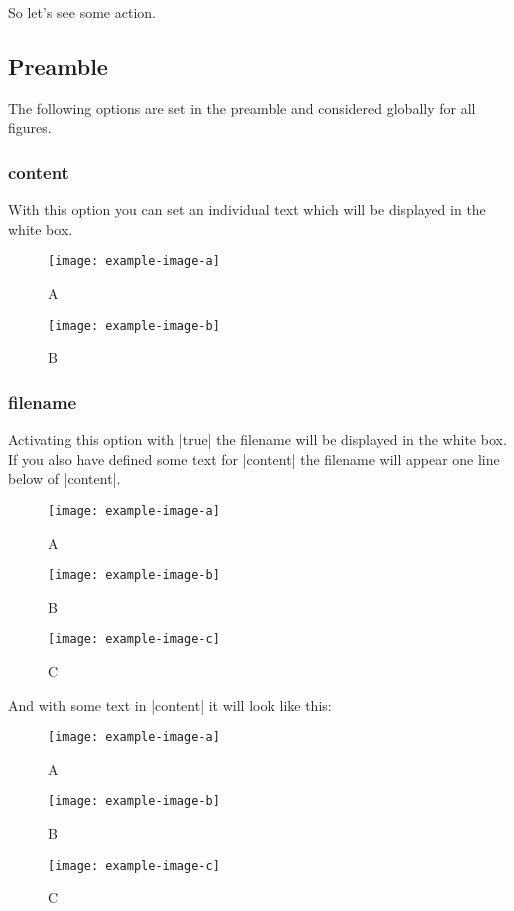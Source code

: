 \documentclass[a4paper,
10pt,
english
]{ltxdoc}
\begin{document}
So let’s see some action.
\subsection{Preamble}
The following options are set in the preamble and considered globally for all figures.
\subsubsection{content}
With this option you can set an individual text which will be displayed in the white box.
\begin{code}
\usepackage[%
  content = {This figure is omitted due to missing copyrights.},%
  ]{draftfigure}
\end{code}
\begin{examplebox}
\begin{figure}[H]
  \centering
  \texttt{[image: example-image-a]}
  \caption{A}
  \texttt{[image: example-image-b]}
  \caption{B}
\end{figure}
\end{examplebox}
\clearpage
\subsubsection{filename}
Activating this option with |true| the filename will be displayed in the white box.
If you also have defined some text for |content| the filename will appear one line below of |content|.
\begin{code}
\usepackage[%
  filename,%
  ]{draftfigure}
\end{code}
\begin{examplebox}
\begin{figure}[H]
  \centering
  \texttt{[image: example-image-a]}
  \caption{A}
  \texttt{[image: example-image-b]}
  \caption{B}
  \texttt{[image: example-image-c]}
  \caption{C}
\end{figure}
\end{examplebox}
\clearpage
{}
And with some text in |content| it will look like this:
\begin{code}
\usepackage[%
  filename,%
  content={no image available}
  ]{draftfigure}
\end{code}
\begin{examplebox}
\begin{figure}[H]
  \centering
  \texttt{[image: example-image-a]}
  \caption{A}
  \texttt{[image: example-image-b]}
  \caption{B}
  \texttt{[image: example-image-c]}
  \caption{C}
\end{figure}
\end{examplebox}
\clearpage
\end{document}

